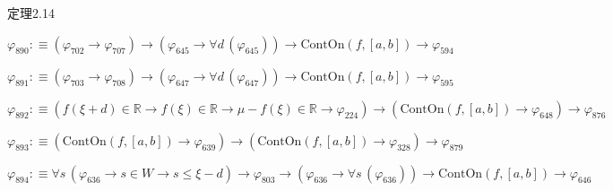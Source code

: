 \begin{fullproof}{定理2.14}
\begin{abbrevlist}
\item $\varphi_{890} :\equiv (\varphi_{702} \to \varphi_{707}) \to (\varphi_{645} \to \forall d\,(\varphi_{645})) \to \mathrm{ContOn}(f,[a,b]) \to \varphi_{594}$
\item $\varphi_{891} :\equiv (\varphi_{703} \to \varphi_{708}) \to (\varphi_{647} \to \forall d\,(\varphi_{647})) \to \mathrm{ContOn}(f,[a,b]) \to \varphi_{595}$
\item $\varphi_{892} :\equiv (f(\xi + d) \in \mathbb{R} \to f(\xi) \in \mathbb{R} \to \mu - f(\xi) \in \mathbb{R} \to \varphi_{224}) \to (\mathrm{ContOn}(f,[a,b]) \to \varphi_{648}) \to \varphi_{876}$
\item $\varphi_{893} :\equiv (\mathrm{ContOn}(f,[a,b]) \to \varphi_{639}) \to (\mathrm{ContOn}(f,[a,b]) \to \varphi_{328}) \to \varphi_{879}$
\item $\varphi_{894} :\equiv \forall s\,(\varphi_{636} \to s \in W \to s \leq \xi - d) \to \varphi_{803} \to (\varphi_{636} \to \forall s\,(\varphi_{636})) \to \mathrm{ContOn}(f,[a,b]) \to \varphi_{646}$
\end{abbrevlist}
\end{fullproof}
